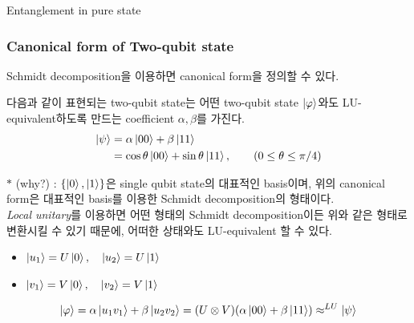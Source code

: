 \documentclass[9pt]{beamer}
\begin{document}
\begin{section}{Entanglement in pure state}
        \begin{frame}
            \frametitle{Canonical form of Two-qubit state}
            Schmidt decomposition을 이용하면 canonical form을 정의할 수 있다.
            \begin{definition}
                다음과 같이 표현되는 two-qubit state는 어떤 two-qubit state $\ket{\varphi}$와도 LU-equivalent하도록 만드는 coefficient $\alpha, \beta$를 가진다.
                \begin{align*}
                    \ket \psi &= \alpha \ket{00} + \beta \ket{11}\\
                                &= \cos \theta \ket{00} + \sin \theta \ket{11},\qquad (0 \le \theta \le \pi/4)
                \end{align*}
            \end{definition}
            \vspace{0.4cm}
            $\ast$ (why?) : $\{\ket0, \ket 1\}$은 single qubit state의 대표적인 basis이며, 위의 canonical form은 대표적인 basis를 이용한 Schmidt decomposition의 형태이다.\\
            \vspace{0.2cm}
            \textit{Local unitary}를 이용하면 어떤 형태의 Schmidt decomposition이든 위와 같은 형태로 변환시킬 수 있기 때문에, 어떠한 상태와도 LU-equivalent 할 수 있다.
            \begin{itemize}
                \item $\ket{u_1} = U\ket{0},\quad \ket{u_2} = U\ket{1}$
                \item $\ket{v_1} = V\ket{0},\quad \ket{v_2} = V\ket{1}$
            \end{itemize}
            \vspace{0.2cm}
            \begin{equation*}
                \ket \varphi =  \alpha \ket{u_1v_1} + \beta \ket{u_2 v_2} = (U \otimes V)(\alpha \ket{00} + \beta \ket{11}) \approx^{LU} \ket{\psi}
            \end{equation*}
        
        \end{frame}
    \end{section}
    
\end{document}
